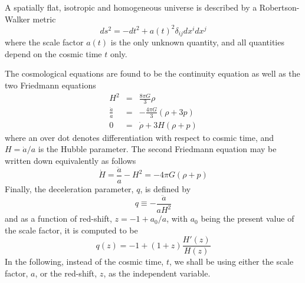 \documentclass[aps,prd,amsmath,amssymb]{revtex4}
\begin{document}
A spatially flat, isotropic and homogeneous universe is described by a Robertson-Walker metric \cite{review}
\begin{equation}
ds^2 = -dt^2 + a(t)^2 \delta_{ij} dx^i dx^j 
\end{equation}
where the scale factor $a(t)$ is the only unknown quantity, and all quantities depend on the cosmic time $t$ only.

\smallskip

The cosmological equations are found to be the continuity equation as well as the two Friedmann
equations \cite{review}
\begin{eqnarray}
H^2 & = & \frac{8 \pi G}{3} \rho \\
\frac{\ddot{a}}{a} & = & -\frac{4 \pi G}{3} (\rho + 3p) \\
0 & = & \dot{\rho} + 3 H (\rho+p)
\end{eqnarray}
where an over dot denotes differentiation with respect to cosmic time, and $H=\dot{a}/a$ is the Hubble parameter. The
second Friedmann equation may be written down equivalently as follows
\begin{equation}
\dot{H} = \frac{\ddot{a}}{a} - H^2 = - 4 \pi G (\rho+p)
\end{equation}
Finally, the deceleration parameter, $q$, is defined by
\begin{equation}
q \equiv - \frac{\ddot{a}}{aH^2}
\end{equation}
and as a function of red-shift, $z=-1+a_0/a$, with $a_0$ being the present value of the scale factor, it is computed to be
\begin{equation}
q(z) = -1 + (1+z) \frac{H'(z)}{H(z)}
\end{equation}
In the following, instead of the cosmic time, $t$, we shall be using either the scale factor, $a$, or the red-shift, 
$z$, as the independent variable.

\smallskip
\end{document}

